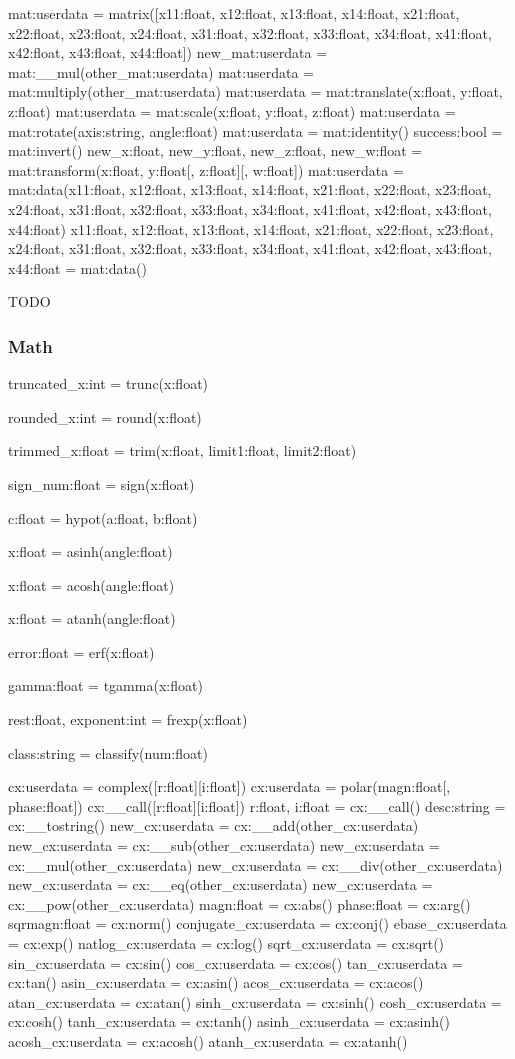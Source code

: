 mat:userdata = matrix([x11:float, x12:float, x13:float, x14:float, x21:float, x22:float, x23:float, x24:float, x31:float, x32:float, x33:float, x34:float, x41:float, x42:float, x43:float, x44:float])
new\_mat:userdata = mat:\_\_mul(other\_mat:userdata)
mat:userdata = mat:multiply(other\_mat:userdata)
mat:userdata = mat:translate(x:float, y:float, z:float)
mat:userdata = mat:scale(x:float, y:float, z:float)
mat:userdata = mat:rotate(axis:string, angle:float)
mat:userdata = mat:identity()
success:bool = mat:invert()
new\_x:float, new\_y:float, new\_z:float, new\_w:float = mat:transform(x:float, y:float[, z:float][, w:float])
mat:userdata = mat:data(x11:float, x12:float, x13:float, x14:float, x21:float, x22:float, x23:float, x24:float, x31:float, x32:float, x33:float, x34:float, x41:float, x42:float, x43:float, x44:float)
x11:float, x12:float, x13:float, x14:float, x21:float, x22:float, x23:float, x24:float, x31:float, x32:float, x33:float, x34:float, x41:float, x42:float, x43:float, x44:float = mat:data()

TODO

\subsubsection{Math}
\label{sec:math}

truncated\_x:int = trunc(x:float)

rounded\_x:int = round(x:float)

trimmed\_x:float = trim(x:float, limit1:float, limit2:float)

sign\_num:float = sign(x:float)

c:float = hypot(a:float, b:float)

x:float = asinh(angle:float)

x:float = acosh(angle:float)

x:float = atanh(angle:float)

error:float = erf(x:float)

gamma:float = tgamma(x:float)

rest:float, exponent:int = frexp(x:float)

class:string = classify(num:float)

cx:userdata = complex([r:float][i:float])
cx:userdata = polar(magn:float[, phase:float])
cx:\_\_call([r:float][i:float])
r:float, i:float = cx:\_\_call()
desc:string = cx:\_\_tostring()
new\_cx:userdata = cx:\_\_add(other\_cx:userdata)
new\_cx:userdata = cx:\_\_sub(other\_cx:userdata)
new\_cx:userdata = cx:\_\_mul(other\_cx:userdata)
new\_cx:userdata = cx:\_\_div(other\_cx:userdata)
new\_cx:userdata = cx:\_\_eq(other\_cx:userdata)
new\_cx:userdata = cx:\_\_pow(other\_cx:userdata)
magn:float = cx:abs()
phase:float = cx:arg()
sqrmagn:float = cx:norm()
conjugate\_cx:userdata = cx:conj()
ebase\_cx:userdata = cx:exp()
natlog\_cx:userdata = cx:log()
sqrt\_cx:userdata = cx:sqrt()
sin\_cx:userdata = cx:sin()
cos\_cx:userdata = cx:cos()
tan\_cx:userdata = cx:tan()
asin\_cx:userdata = cx:asin()
acos\_cx:userdata = cx:acos()
atan\_cx:userdata = cx:atan()
sinh\_cx:userdata = cx:sinh()
cosh\_cx:userdata = cx:cosh()
tanh\_cx:userdata = cx:tanh()
asinh\_cx:userdata = cx:asinh()
acosh\_cx:userdata = cx:acosh()
atanh\_cx:userdata = cx:atanh()

